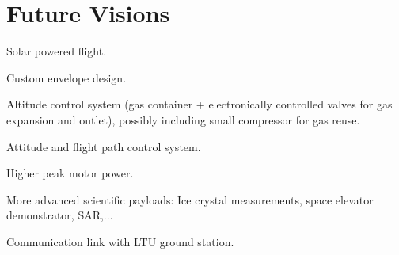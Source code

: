 \newpage
\chapter{Future Visions}
\label{chap:visions}

Solar powered flight.

Custom envelope design.

Altitude control system (gas container + electronically controlled valves for gas expansion and outlet), possibly including small compressor for gas reuse.

Attitude and flight path control system.

Higher peak motor power.

More advanced scientific payloads: Ice crystal measurements, space elevator demonstrator, SAR,...

Communication link with LTU ground station.
